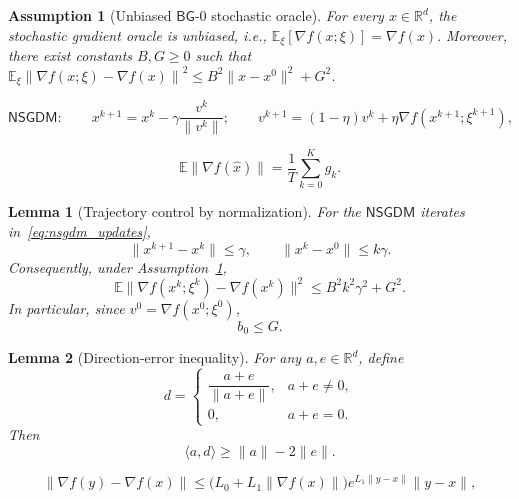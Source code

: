 \documentclass[10pt,a4paper]{amsart}
\newtheorem{assumption}{Assumption}
\newtheorem{lemma}{Lemma}
\newcommand{\E}{\mathbb{E}}
\newcommand{\R}{\mathbb{R}}
\begin{document}
\begin{assumption}[Unbiased $\mathsf{BG}$-0 stochastic oracle]
    \label{as:bg0_oracle}
    For every $x\in\R^d$, the stochastic gradient oracle is unbiased, i.e., $\E_\xi[\nabla f(x;\xi)]=\nabla f(x).$ Moreover, there exist constants $B,G\ge0$ such that $\E_\xi \left\| \nabla f(x;\xi)-\nabla f(x) \right\|^2 \le B^2\|x-x^0\|^2+G^2$.
\end{assumption}

\begin{equation}
\label{eq:nsgdm_updates}
\mathsf{NSGDM:}\qquad
x^{k+1} = x^k-\gamma\frac{v^k}{\|v^k\|};
\qquad
v^{k+1} = (1-\eta)v^k+\eta\nabla f(x^{k+1};\xi^{k+1}),
\end{equation}

\begin{equation}
\label{eq:app_uniform_output_identity}
    \E\|\nabla f(\widehat x)\|
    =
    \frac1T\sum_{k=0}^K g_k.
\end{equation}

\begin{lemma}[Trajectory control by normalization]
\label{lem:app_traj_control}
For the \(\mathsf{NSGDM}\) iterates in~\eqref{eq:nsgdm_updates},
\[
    \|x^{k+1}-x^k\|\le \gamma,
    \qquad
    \|x^k-x^0\|\le k\gamma.
\]
Consequently, under Assumption~\ref{as:bg0_oracle},
\begin{equation}
\label{eq:app_bg0_along_path}
    \E\|\nabla f(x^k;\xi^k)-\nabla f(x^k)\|^2
    \le B^2k^2\gamma^2+G^2.
\end{equation}
In particular, since \(v^0=\nabla f(x^0;\xi^0)\),
\begin{equation}
\label{eq:app_B0_bound}
    b_0\le G.
\end{equation}
\end{lemma}

\begin{lemma}[Direction-error inequality]
\label{lem:app_direction_error}
For any \(a,e\in\R^d\), define
\[
    d=
    \begin{cases}
        \dfrac{a+e}{\|a+e\|}, & a+e\neq0,\\[4pt]
        0, & a+e=0.
    \end{cases}
\]
Then
\begin{equation}
\label{eq:app_direction_error}
    \langle a,d\rangle\ge \|a\|-2\|e\|.
\end{equation}
\end{lemma}

\begin{equation}
\label{eq:app_l1_grad_consequence}
    \|\nabla f(y)-\nabla f(x)\|
    \le
    \bigl(L_0+L_1\|\nabla f(x)\|\bigr)
    e^{L_1\|y-x\|}\|y-x\|,
\end{equation}
\end{document}
